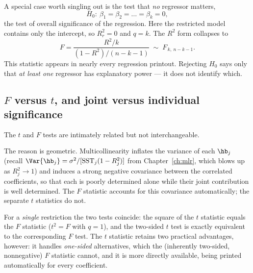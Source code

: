 A special case worth singling out is the test that \emph{no} regressor matters,
\[
H_0:\ \beta_1 = \beta_2 = \dots = \beta_k = 0,
\]
the test of overall significance of the regression. Here the restricted model contains only the intercept, so $R_r^2 = 0$ and $q = k$. The $R^2$ form collapses to
\[
F = \frac{R^2/k}{(1 - R^2)/(n-k-1)} \;\sim\; F_{\,k,\ n-k-1}.
\]
This statistic appears in nearly every regression printout. Rejecting $H_0$ says only that \emph{at least one} regressor has explanatory power --- it does not identify which.

\subsection{$F$ versus $t$, and joint versus individual significance}

The $t$ and $F$ tests are intimately related but not interchangeable.


The reason is geometric. Multicollinearity inflates the variance of each $\hb_j$ (recall $\Var{\hb_j} = \sigma^2/[\text{SST}_j(1-R_j^2)]$ from Chapter~\ref{ch:mlr}, which blows up as $R_j^2\to 1$) and induces a strong negative covariance between the correlated coefficients, so that each is poorly determined alone while their joint contribution is well determined. The $F$ statistic accounts for this covariance automatically; the separate $t$ statistics do not.

For a \emph{single} restriction the two tests coincide: the square of the $t$ statistic equals the $F$ statistic ($t^2 = F$ with $q=1$), and the two-sided $t$ test is exactly equivalent to the corresponding $F$ test. The $t$ statistic retains two practical advantages, however: it handles \emph{one-sided} alternatives, which the (inherently two-sided, nonnegative) $F$ statistic cannot, and it is more directly available, being printed automatically for every coefficient.

